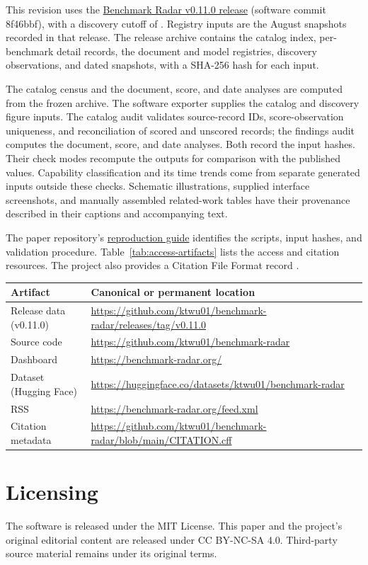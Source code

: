 \documentclass[11pt]{article}
\newcommand{\datacutoff}{\ReportDataCutoff}
\newcommand{\gitcommit}{8f46bbf}
\begin{document}
This revision uses the \href{https://github.com/ktwu01/benchmark-radar/releases/tag/v0.11.0}{Benchmark Radar v0.11.0 release} (software commit \gitcommit{}), with a discovery cutoff of \datacutoff{}. Registry inputs are the August snapshots recorded in that release. The release archive contains the catalog index, per-benchmark detail records, the document and model registries, discovery observations, and dated snapshots, with a SHA-256 hash for each input.

The catalog census and the document, score, and date analyses are computed from the frozen archive. The software exporter supplies the catalog and discovery figure inputs. The catalog audit validates source-record IDs, score-observation uniqueness, and reconciliation of scored and unscored records; the findings audit computes the document, score, and date analyses. Both record the input hashes. Their check modes recompute the outputs for comparison with the published values. Capability classification and its time trends come from separate generated inputs outside these checks. Schematic illustrations, supplied interface screenshots, and manually assembled related-work tables have their provenance described in their captions and accompanying text.

The paper repository's \href{https://github.com/ktwu01/benchmark-radar-paper/blob/44f4146b1f67ba82b9af71d93d80b249b8887e93/README.md\#reproduce-the-papers-numbers}{reproduction guide} identifies the scripts, input hashes, and validation procedure. Table~\ref{tab:access-artifacts} lists the access and citation resources. The project also provides a Citation File Format record \citep{smith2016,katz2021,cff}.

\begin{center}
\centering
\small
\begin{tabularx}{\textwidth}{L{0.28\textwidth}Y}
\toprule
\textbf{Artifact} & \textbf{Canonical or permanent location}\\
\midrule
Release data (v0.11.0) & \url{https://github.com/ktwu01/benchmark-radar/releases/tag/v0.11.0}\\
Source code & \url{https://github.com/ktwu01/benchmark-radar}\\
Dashboard & \url{https://benchmark-radar.org/}\\
Dataset (Hugging Face) & \url{https://huggingface.co/datasets/ktwu01/benchmark-radar}\\
RSS & \url{https://benchmark-radar.org/feed.xml}\\
Citation metadata & \url{https://github.com/ktwu01/benchmark-radar/blob/main/CITATION.cff}\\
\bottomrule
\end{tabularx}
\label{tab:access-artifacts}
\end{center}

\section*{Licensing}
The software is released under the MIT License. This paper and the project's original editorial content are released under CC BY-NC-SA 4.0. Third-party source material remains under its original terms.
\end{document}
